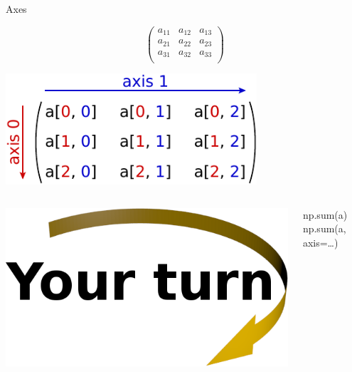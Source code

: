 \documentclass[svgnames]{beamer}
\begin{document}
\begin{frame}{Axes}
 \begin{Large}
  \begin{displaymath}
   \begin{pmatrix}
    a_{11} & a_{12} & a_{13} \\
    a_{21} & a_{22} & a_{23} \\
    a_{31} & a_{32} & a_{33} \\
   \end{pmatrix}
  \end{displaymath}
 \end{Large}

 \begin{center}
  \includegraphics[width=0.7\textwidth]{axes}
 \end{center}

 \begin{columns}
  \begin{column}{0.4\textwidth}
   \begin{center}
    \includegraphics[width=3truecm]{yourturn}
   \end{center}
  \end{column}%
  \begin{column}{0.6\textwidth}
   np.sum(a)\\
   np.sum(a, axis=\ldots)
  \end{column}
 \end{columns}
\end{frame}
\end{document}
